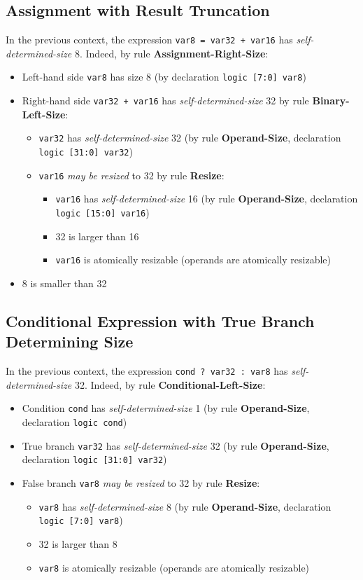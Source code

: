 \documentclass{article}
\newcommand{\sv}[1]{\texttt{#1}}
\newcommand{\sds}{\emph{self-determined-size}}
\newcommand{\mbr}{\emph{may be resized}}
\begin{document}
\subsection{Assignment with Result Truncation}

In the previous context, the expression \sv{var8 = var32 + var16} has
\sds{} 8. Indeed, by rule \textbf{Assignment-Right-Size}:

\begin{itemize}
  \item Left-hand side \sv{var8} has size 8 (by declaration
    \sv{logic [7:0] var8})
  \item Right-hand side \sv{var32 + var16} has \sds{}
    32 by rule \textbf{Binary-Left-Size}:
    \begin{itemize}
      \item \sv{var32} has \sds{} 32 (by rule
        \textbf{Operand-Size}, declaration \sv{logic [31:0] var32})
      \item \sv{var16} \mbr{} to 32 by rule
        \textbf{Resize}:
        \begin{itemize}
          \item \sv{var16} has \sds{} 16 (by rule
            \textbf{Operand-Size}, declaration \sv{logic [15:0] var16})
          \item 32 is larger than 16
          \item \sv{var16} is atomically resizable (operands are atomically
            resizable)
        \end{itemize}
    \end{itemize}
  \item 8 is smaller than 32
\end{itemize}

\subsection{Conditional Expression with True Branch Determining Size}

In the previous context, the expression \sv{cond ? var32 : var8} has
\sds{} 32. Indeed, by rule \textbf{Conditional-Left-Size}:

\begin{itemize}
  \item Condition \sv{cond} has \sds{} 1 (by rule
    \textbf{Operand-Size}, declaration \sv{logic cond})
  \item True branch \sv{var32} has \sds{} 32 (by rule
    \textbf{Operand-Size}, declaration \sv{logic [31:0] var32})
  \item False branch \sv{var8} \mbr{} to 32 by rule
    \textbf{Resize}:
    \begin{itemize}
      \item \sv{var8} has \sds{} 8 (by rule
        \textbf{Operand-Size}, declaration \sv{logic [7:0] var8})
      \item 32 is larger than 8
      \item \sv{var8} is atomically resizable (operands are atomically
        resizable)
    \end{itemize}
\end{itemize}
\end{document}
